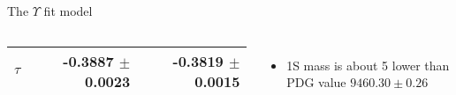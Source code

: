 \begin{frame}{The $\Upsilon$ fit model}
\begin{columns}
{\begin{tabular}{lrr}
$\tau$ & -0.3887 $\pm$ 0.0023 & -0.3819 $\pm$ 0.0015\\
\bottomrule
\end{tabular}
} %

\bigskip

\begin{itemize}
\item \Y1S mass is about 5 \mevcc lower than PDG value $9460.30 \pm  0.26$ \mevcc
\end{itemize}
\end{columns}


\end{frame}

